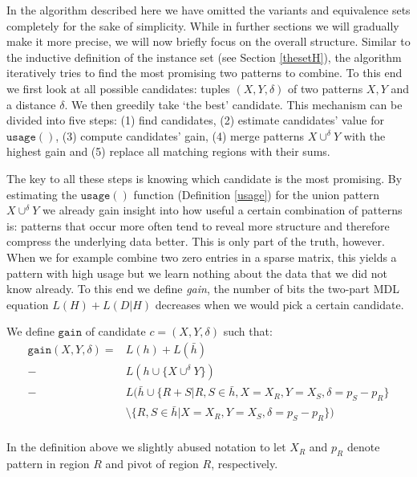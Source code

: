\documentclass{llncs}
\begin{document}
In the algorithm described here we have omitted the variants and equivalence sets completely for the sake of simplicity. While in further sections we will gradually make it more precise, we will now briefly focus on the overall structure. Similar to the inductive definition of the instance set (see Section \ref{thesetH}), the algorithm iteratively tries to find the most promising two patterns to combine. To this end we first look at all possible candidates: tuples $(X,Y,\delta)$ of two patterns $X,Y$ and a distance $\delta$. We then greedily take `the best' candidate. This mechanism can be divided into five steps: (1) find candidates, (2) estimate candidates' value for $\mathtt{usage}()$, (3) compute candidates' gain, (4) merge patterns $X \cup^{\delta} Y$  with the highest gain and (5) replace all matching regions with their sums. 

The key to all these steps is knowing which candidate is the most promising. By estimating the $\mathtt{usage}()$ function (Definition \ref{usage}) for the union pattern $X \cup^{\delta} Y$ we already gain insight into how useful a certain combination of patterns is: patterns that occur more often tend to reveal more structure and therefore compress the underlying data better. This is only part of the truth, however. When we for example combine two zero entries in a sparse matrix, this yields a pattern with high usage but we learn nothing about the data that we did not know already. To this end we define \emph{gain}, the number of bits the two-part MDL equation $L(H)+L(D|H)$ decreases when we would pick a certain candidate.
\begin{definition} We define $\mathtt{gain}$ of candidate $c=(X,Y,\delta)$ such that:
\begin{align*}
	\mathtt{gain}(X,Y,\delta) = &L(h) + L(\bar{h}) \\
	 - &L(h \cup \{X\cup^{\delta}Y\})\\ 
	 - &L(\bar{h} \cup \{R+S | R,S \in \bar{h}, X = X_R, Y = X_S, \delta = p_S-p_R\} \\
	 &\setminus \{R,S \in \bar{h} | X = X_R, Y = X_S, \delta = p_S-p_R\}) \\	 
\end{align*}
\end{definition}
In the definition above we slightly abused notation to let $X_R$ and $p_R$ denote pattern in region $R$ and pivot of region $R$, respectively.
\end{document}
